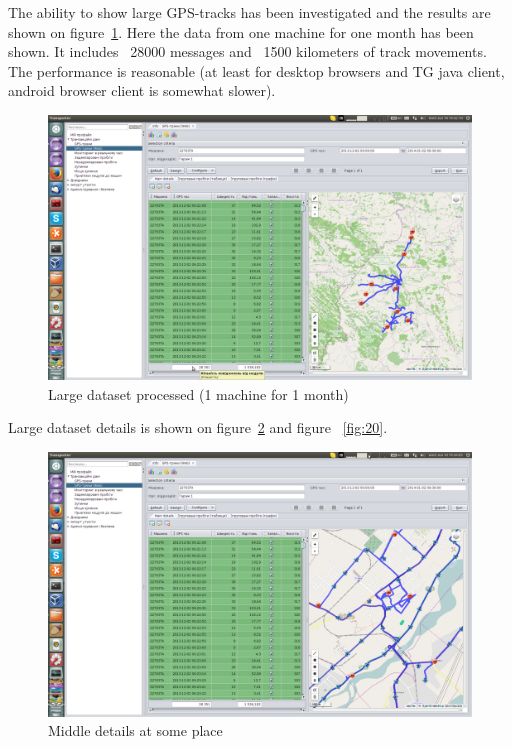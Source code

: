 \newpage
The ability to show large GPS-tracks has been investigated and the results are shown on figure~\ref{fig:18}. Here the data from one machine for one month has been shown. It includes ~28000 messages and ~1500 kilometers of track movements. The performance is reasonable (at least for desktop browsers and TG java client, android browser client is somewhat slower).

\begin{figure}[H]
\centering
\includegraphics[width=\linewidth]{chapters/02-gpstracks/images/18-huge-dataset-processed-1machine-1month.png}
\caption{Large dataset processed (1 machine for 1 month)}\label{fig:18}
\end{figure}

\newpage
Large dataset details is shown on figure~\ref{fig:19} and figure ~\ref{fig:20}.

\begin{figure}[H]
\centering
\includegraphics[width=\linewidth]{chapters/02-gpstracks/images/19-middle-details-at-some-place.png}
\caption{Middle details at some place}\label{fig:19}
\end{figure}

